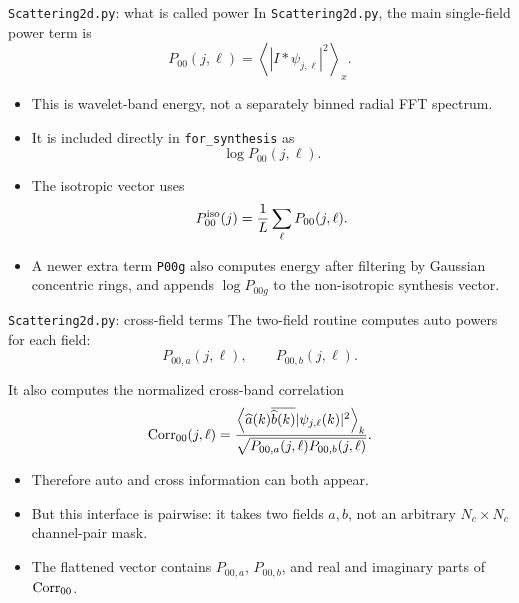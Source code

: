 \documentclass[10pt]{beamer}
\begin{document}
\begin{frame}{\texttt{Scattering2d.py}: what is called power}
  In \texttt{Scattering2d.py}, the main single-field power term is
  \[
    P_{00}(j,\ell)
    =
    \left\langle
      |I\ast\psi_{j,\ell}|^2
    \right\rangle_x .
  \]

  \begin{itemize}
    \item This is wavelet-band energy, not a separately binned radial FFT
    spectrum.
    \item It is included directly in \texttt{for\_synthesis} as
    \[
      \log P_{00}(j,\ell).
    \]
    \item The isotropic vector uses
    \[
      P_{00}^{\rm iso}(j)=\frac{1}{L}\sum_\ell P_{00}(j,\ell).
    \]
    \item A newer extra term \texttt{P00g} also computes energy after filtering
    by Gaussian concentric rings, and appends \(\log P_{00g}\) to the
    non-isotropic synthesis vector.
  \end{itemize}
\end{frame}

\begin{frame}{\texttt{Scattering2d.py}: cross-field terms}
  The two-field routine computes auto powers for each field:
  \[
    P_{00,a}(j,\ell),\qquad P_{00,b}(j,\ell).
  \]

  It also computes the normalized cross-band correlation
  \[
    {\rm Corr}_{00}(j,\ell)
    =
    \frac{
      \left\langle
        \widehat a(k)\overline{\widehat b(k)}
        |\psi_{j,\ell}(k)|^2
      \right\rangle_k
    }{
      \sqrt{P_{00,a}(j,\ell)P_{00,b}(j,\ell)}
    }.
  \]

  \begin{itemize}
    \item Therefore auto and cross information can both appear.
    \item But this interface is pairwise: it takes two fields \(a,b\), not an
    arbitrary \(N_c\times N_c\) channel-pair mask.
    \item The flattened vector contains \(P_{00,a}\), \(P_{00,b}\), and real and
    imaginary parts of \({\rm Corr}_{00}\).
  \end{itemize}
\end{frame}
\end{document}
